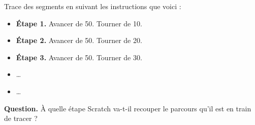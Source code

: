 \documentclass[class=report,crop=false, 12pt]{standalone}
\begin{document}
\begin{enigme}
Trace des segments en suivant les instructions que voici :
\begin{itemize}
  \item \textbf{\'Etape 1.} Avancer de 50. Tourner de 10\textdegree.
  \item \textbf{\'Etape 2.} Avancer de 50. Tourner de 20\textdegree. 
  \item \textbf{\'Etape 3.} Avancer de 50. Tourner de 30\textdegree.   
  \item \ldots
  \item \ldots
\end{itemize}

\bigskip

\textbf{Question.} À quelle étape Scratch va-t-il recouper le parcours qu'il est en train de tracer ?



\end{enigme}
\end{document}

